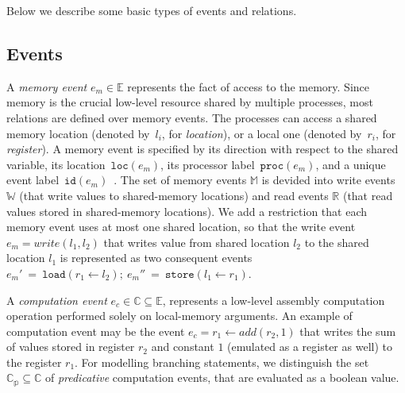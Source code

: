 Below we describe some basic types of events and relations.

\subsection{Events}
\label{ch:wmm:model:events}

A \textit{memory event} $e_m \in \mathbb{E}$ represents the fact of access to the memory. Since memory is the crucial low-level resource shared by multiple processes, most relations are defined over memory events. 
The processes can access a shared memory location (denoted by~$l_i$, for \textit{location}), or a local one (denoted by~$r_i$, for \textit{register}). A memory event is specified by its direction with respect to the shared variable, its location~$\mathtt{loc}(e_m)$, its processor label~$\mathtt{proc}(e_m)$, and a unique event label~$\mathtt{id}(e_m)$~\cite{alglave2010shared}. 
The set of memory events $\mathbb{M}$ is devided into write events $\mathbb{W}$ (that write values to shared-memory locations) and read events $\mathbb{R}$ (that read values stored in shared-memory locations).
We add a restriction that each memory event uses at most one shared location, so that the write event $e_m = write(l_1, l_2)$ that writes value from shared location $l_2$ to the shared location $l_1$ is represented as two consequent events $e_m'~=~\mathtt{load}(r_1 \leftarrow l_2); \ e_m''~=~\mathtt{store}(l_1 \leftarrow r_1)$.

A \textit{computation event} $e_c \in \mathbb{C} \subseteq \mathbb{E}$, represents a low-level assembly computation operation performed solely on local-memory arguments. An example of computation event may be the event $e_c = r_1 \leftarrow add(r_2, 1)$ that writes the sum of values stored in register $r_2$ and constant $1$ (emulated as a register as well) to the register $r_1$. For modelling branching statements, we distinguish the set $\mathbb{C_{p}} \subseteq \mathbb{C}$ of \textit{predicative} computation events, that are evaluated as a boolean value.%


